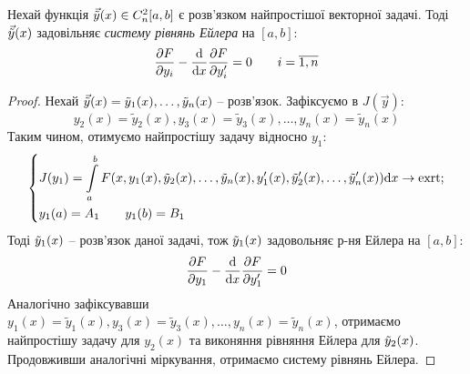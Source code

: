 \documentclass[14pt,a4paper]{scrartcl}
\theoremstyle{definition}
\theoremstyle{definition}
\theoremstyle{definition}
\begin{document}
\begin{boxteo}
 Нехай функція  $\vec{\tilde{y}} (x) \in C_n^2 [a,b]$ є розв'язком найпростішої векторної задачі. Тоді $\vec{\tilde{y}} (x)$ задовільняє
 \textit{систему рівнянь Ейлера} на $[a,b]$:
 $$
 \frac{\partial F}{\partial y_i } - \frac{\mathrm{d}}{\mathrm{d} x} \frac{\partial F}{\partial y_i'} = 0 \qquad i = \overline{1, n}
 $$
\end{boxteo}
\begin{proof}
 Нехай $\vec{\tilde{y}}(x) = \tilde{y}_1 (x),  \dots , \tilde{y}_n (x)$ -- розв'язок. Зафіксуємо в $J(\overrightarrow{y})$:
 $$
 y_2 (x) = \tilde{y}_2(x), y_3 (x) = \tilde{y}_3(x), \dots , y_n (x) = \tilde{y}_n(x)
 $$
 Таким чином, отимуємо найпростішу задачу відносно $y_1$:
 $$
 \begin{dcases}
  J(y_1) =  \int\limits_{a}^{ b}{F(x, y_1(x), \tilde{y}_2(x), \dots, \tilde{y}_n(x), y_1'(x), \tilde{y}_2'(x), \dots, \tilde{y}_n'(x))} \mathrm{d} x \to \mathrm{exrt};\\
  y_1(a) = A_1 \qquad y_1 (b) = B_1
 \end{dcases}
 $$
 Тоді $\tilde{y}_1(x)$ -- розв'язок даної задачі, тож $\tilde{y}_1(x)$  задовольняє р-ня Ейлера на $[a,b]$:
 $$
 \frac{\partial F}{\partial y_1} - \frac{\mathrm{d}}{ \mathrm{d} x} \frac{\partial F}{\partial y_1'} = 0
 $$
 Аналогічно зафіксувавши $ y_1 (x) = \tilde{y}_1(x), y_3 (x) = \tilde{y}_3(x), \dots , y_n (x) = \tilde{y}_n(x)$,  отримаємо найпростішу задачу для $y_2(x)$ та виконяння рівняння Ейлера для $\tilde{y}_2 (x)$. Продовживши аналогічні міркування, отримаємо систему рівнянь Ейлера.
\end{proof}
\newpage
\end{document}
